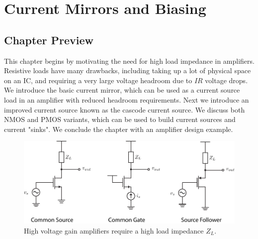 \chapter{Current Mirrors and Biasing}
\label{ch:ch13_mirrors_biasing}
\graphicspath{{./figs_current_source/}}
\section{Chapter Preview}
This chapter begins by motivating the need for high load impedance in amplifiers.  Resistive loads have many drawbacks, including taking up a lot of physical space on an IC, and requiring a very large voltage headroom due to $IR$ voltage drops.  We introduce the basic current mirror, which can be used as a current source load in an amplifier with reduced headroom requirements.  Next we introduce an improved current source known as the cascode current source.  We discuss both NMOS and PMOS variants, which can be used to build current sources and current "sinks".  We conclude the chapter with an amplifier design example.
\newpage
\begin{figure}[t]
\centering
\includegraphics[width=.85\columnwidth]{0highZload.pdf}
\caption{High voltage gain amplifiers require a high load impedance $Z_L$.}
\label{fig:0highZload.pdf}
\end{figure}
